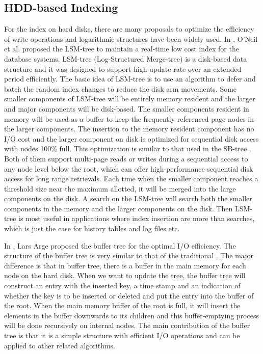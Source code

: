 \subsection{HDD-based Indexing}
For the \bplustree index on hard disks,
there are many proposals to optimize the efficiency
of write operations and logarithmic
structures have been widely used.
In \cite{o1996log}, O'Neil et al. proposed the LSM-tree to
maintain a real-time low cost index for the database systems.
LSM-tree (Log-Structured Merge-tree) is a disk-based data structure and it was designed to support high update rate over an extended period efficiently. The basic idea of LSM-tree is to use an algorithm to defer and batch the random index changes to reduce the disk arm movements. Some smaller components of LSM-tree will be entirely memory resident and the larger and major components will be disk-based. The smaller components resident in memory will be used as a buffer to keep the frequently referenced page nodes in the larger components. The insertion to the memory resident component has no I/O cost and the larger component on disk is optimized for sequential disk access with nodes 100\% full. This optimization is similar to that used in the SB-tree \cite{o1992thesb}. Both of them support multi-page reads or writes during a sequential access to any node level below the root, which can offer high-performance sequential disk access for long range retrievals. Each time when the smaller component reaches a threshold size near the maximum allotted, it will be merged into the large components on the disk. A search on the LSM-tree will search both the smaller components in the memory and the larger components on the disk. Then LSM-tree is most useful in applications where index insertion are more than searches, which is just the case for history tables and log files etc.

In \cite{arge1995buffer}, Lars Arge proposed the buffer tree for the optimal I/O efficiency. The structure of the buffer tree is very similar to that of the traditional \bplustree. The major difference is that in buffer tree, there is a buffer in the main memory for each node on the hard disk. When we want to update the tree, the buffer tree will construct an entry with the inserted key, a time stamp and an indication of whether the key is to be inserted or deleted and put the entry into the buffer of the root. When the main memory buffer of the root is full, it will insert the elements in the buffer downwards to its children and this buffer-emptying process will be done recursively on internal nodes. The main contribution of the buffer tree is that it is a simple structure with efficient I/O operations and can be applied to other related algorithms.



